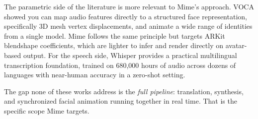 The parametric side of the literature is more relevant to Mime's approach. VOCA \cite{cudeiro2019voca} showed you can map audio features directly to a structured face representation, specifically 3D mesh vertex displacements, and animate a wide range of identities from a single model. Mime follows the same principle but targets ARKit blendshape coefficients, which are lighter to infer and render directly on avatar-based output. For the speech side, Whisper \cite{radford2023whisper} provides a practical multilingual transcription foundation, trained on 680,000 hours of audio across dozens of languages with near-human accuracy in a zero-shot setting.

The gap none of these works address is the \textit{full pipeline}: translation, synthesis, and synchronized facial animation running together in real time. That is the specific scope Mime targets.